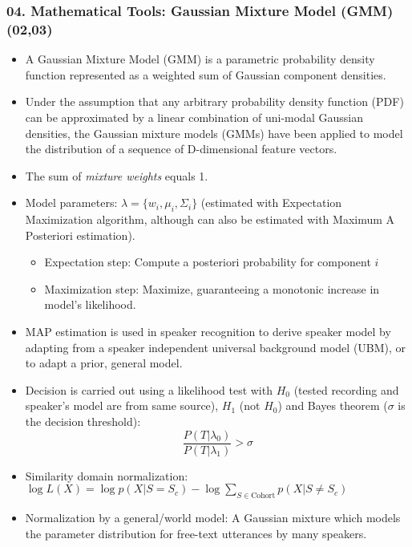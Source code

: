 \documentclass[a4paper]{article}
\begin{document}
    \subsubsection*{04. Mathematical Tools: Gaussian Mixture Model (GMM) (02,03)}
      \begin{itemize}
        \item A Gaussian Mixture Model (GMM) is a parametric probability density function represented as a weighted sum of Gaussian component densities.
        \item Under the assumption that any arbitrary probability density function (PDF) can be approximated by a linear combination of uni-modal Gaussian densities, the Gaussian mixture models (GMMs) have been applied to model the distribution of a sequence of D-dimensional feature vectors.
        \item The sum of \emph{mixture weights} equals 1.
        \item Model parameters: $\lambda = \{w_i, \mu_i,\Sigma_i\}$ (estimated with Expectation Maximization algorithm, although can also be estimated with Maximum A Posteriori estimation).
        \begin{itemize}
          \item Expectation step: Compute a posteriori probability for component $i$
          \item Maximization step: Maximize, guaranteeing a monotonic increase in model's likelihood.
        \end{itemize}
        \item MAP estimation is used in speaker recognition to derive speaker model by adapting from a speaker independent universal background model (UBM), or to adapt a prior, general model.
        \item Decision is carried out using a likelihood test with $H_0$ (tested recording and speaker's model are from same source), $H_1$ (not $H_0$) and Bayes theorem ($\sigma$ is the decision threshold): $$\frac{P(T|\lambda_0)}{P(T|\lambda_1)}>\sigma$$
        \item Similarity domain normalization: $\log{L(X)} = \log{p(X|S=S_c)} -
        \log{\sum_{S\in\text{Cohort}}{p(X|S \neq S_c)}}$
        \item Normalization by a general/world model: A Gaussian mixture which models the parameter distribution for free-text utterances by many speakers.
      \end{itemize}
    \newpage
\end{document}
